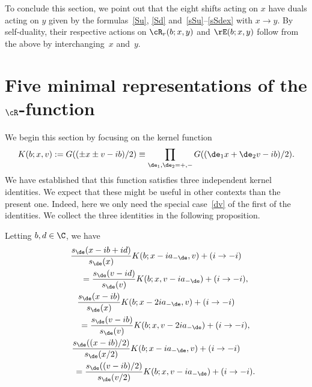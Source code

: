 \documentclass[pdftex]{sigma}
\numberwithin{equation}{section}
\begin{document}
To conclude this section, we point out that the eight shifts acting on $x$ have duals acting on $y$ given by the formulas~\eqref{Su}, \eqref{Sd} and~\eqref{sSu}--\eqref{sSdex} with $x\to y$. By self-duality, their respective actions on  $\cR_r(b;x,y)$ and $\rE(b;x,y)$ follow from the above by interchanging~$x$ and~$y$.



\section[Five minimal representations of the $\cR$-function]{Five minimal representations of the $\boldsymbol{\cR}$-function}\label{section3}

We begin this section by focusing on the kernel function
\begin{gather}
K(b;x,v):=G((\pm x \pm v -ib)/2)\equiv\prod_{\de_1,\de_2=+,-}G((\de_1 x+\de_2 v-ib)/2).
\end{gather}
We have established that this function satisf\/ies three independent kernel identities. We expect that these might be useful in other contexts than the present one. Indeed, here we only need the special case~\eqref{dv} of the f\/irst of the identities. We  collect the three identities in the following proposition.

\begin{prop}\label{proposition3.1}
Letting $b,d\in\C$, we have
\begin{gather}
\frac{s_{\de}(x-ib+id)}{s_{\de}(x)}K(b;x-ia_{-\de},v)+(i\to -i)\nonumber\\
\qquad{} =\frac{s_{\de}(v-id)}{s_{\de}(v)}K(b;x,v-ia_{-\de})+(i\to -i),\label{idd}
\\
\frac{s_{\de}(x-ib)}{s_{\de}(x)}K(b;x-2ia_{-\de},v)+(i\to -i)\nonumber\\
\qquad{}=
\frac{s_{\de}(v-ib)}{s_{\de}(v)}K(b;x,v-2ia_{-\de})+(i\to -i),\label{id2}
\\
\frac{s_{\de}((x-ib)/2)}{s_{\de}(x/2)}K(b;x-ia_{-\de},v)+(i\to -i)\nonumber\\
\qquad{} =
\frac{s_{\de}((v-ib)/2)}{s_{\de}(v/2)}K(b;x,v-ia_{-\de})+(i\to -i).\label{id3}
\end{gather}
\end{prop}
\end{document}

